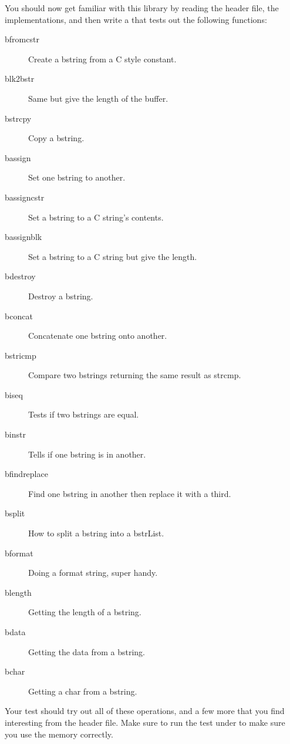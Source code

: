 You should now get familiar with this library by reading the 
header file, the implementations, and then write a 
that tests out the following functions:

\begin{description}
\item[bfromcstr] Create a bstring from a C style constant.
\item[blk2bstr] Same but give the length of the buffer.
\item[bstrcpy] Copy a bstring.
\item[bassign] Set one bstring to another.
\item[bassigncstr] Set a bstring to a C string's contents.
\item[bassignblk] Set a bstring to a C string but give the length.
\item[bdestroy] Destroy a bstring.
\item[bconcat] Concatenate one bstring onto another.
\item[bstricmp] Compare two bstrings returning the same result as strcmp.
\item[biseq] Tests if two bstrings are equal.
\item[binstr] Tells if one bstring is in another.
\item[bfindreplace] Find one bstring in another then replace it with a third.
\item[bsplit] How to split a bstring into a bstrList.
\item[bformat] Doing a format string, super handy.
\item[blength] Getting the length of a bstring.
\item[bdata] Getting the data from a bstring.
\item[bchar] Getting a char from a bstring.
\end{description}

Your test should try out all of these operations, and a few more that you
find interesting from the header file.  Make sure to run the test under
 to make sure you use the memory correctly.

